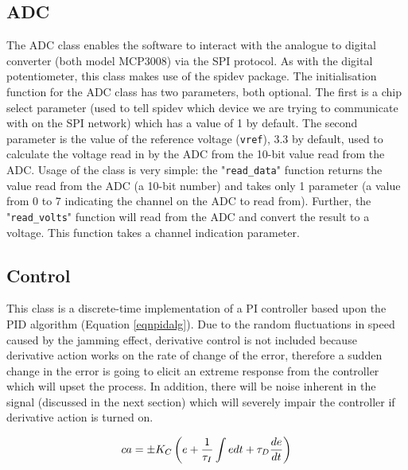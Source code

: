 \documentclass[twoside,a4]{report}
\def\br{\newline \newline \noindent}
\begin{document}
	\subsection*{ADC} %
	The ADC class enables the software to interact with the analogue to digital converter (both model MCP3008) via the SPI protocol. As with the digital potentiometer, this class makes use of the spidev package. \br
	The initialisation function for the ADC class has two parameters, both optional. The first is a chip select parameter (used to tell spidev which device we are trying to communicate with on the SPI network) which has a value of 1 by default. The second parameter is the value of the reference voltage (\texttt{vref}), 3.3 by default, used to calculate the voltage read in by the ADC from the 10-bit value read from the ADC. \br
	Usage of the class is very simple: the "\texttt{read\_data}" function returns the value read from the ADC (a 10-bit number) and takes only 1 parameter (a value from 0 to 7 indicating the channel on the ADC to read from). Further, the "\texttt{read\_volts}" function will read from the ADC and convert the result to a voltage. This function takes a channel indication parameter.
	
	\subsection*{Control} %
	This class is a discrete-time implementation of a PI controller based upon the PID algorithm (Equation \ref{eqnpidalg}). Due to the random fluctuations in speed caused by the jamming effect, derivative control is not included because derivative action works on the rate of change of the error, therefore a sudden change in the error is going to elicit an extreme response from  the controller which will upset the process. In addition, there will be noise inherent in the signal (discussed in the next section) which will severely impair the controller if derivative action is turned on. 
	
	\begin{equation}
	ca = \pm K_C \left(e + \frac{1}{\tau _I} \int e \space dt + \tau _D \frac{de}{dt}\right)
	\label{eqnpidalg}
	\end{equation}
	
	
\end{document}

